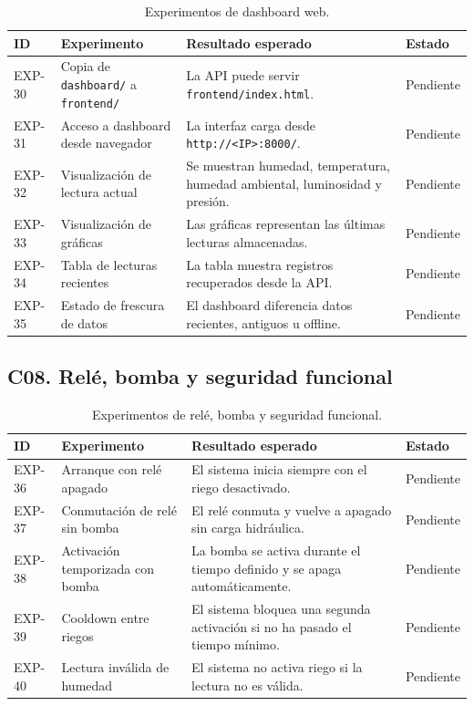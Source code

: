 \begin{table}[H]
\centering
\renewcommand{\arraystretch}{1.2}
\scriptsize
\begin{tabular}{|p{}|p{}|p{}|p{}|}
\hline
\rowcolor{gray!20}
\textbf{ID} & \textbf{Experimento} & \textbf{Resultado esperado} & \textbf{Estado} \\
\hline
EXP-30 & Copia de \texttt{dashboard/} a \texttt{frontend/} & La API puede servir \texttt{frontend/index.html}. & Pendiente \\
\hline
EXP-31 & Acceso a dashboard desde navegador & La interfaz carga desde \texttt{http://<IP>:8000/}. & Pendiente \\
\hline
EXP-32 & Visualización de lectura actual & Se muestran humedad, temperatura, humedad ambiental, luminosidad y presión. & Pendiente \\
\hline
EXP-33 & Visualización de gráficas & Las gráficas representan las últimas lecturas almacenadas. & Pendiente \\
\hline
EXP-34 & Tabla de lecturas recientes & La tabla muestra registros recuperados desde la API. & Pendiente \\
\hline
EXP-35 & Estado de frescura de datos & El dashboard diferencia datos recientes, antiguos u offline. & Pendiente \\
\hline
\end{tabular}
\caption{Experimentos de dashboard web.}
\label{tab:exp_dashboard}
\end{table}

\subsection{C08. Relé, bomba y seguridad funcional}

\begin{table}[H]
\centering
\renewcommand{\arraystretch}{1.2}
\scriptsize
\begin{tabular}{|p{}|p{}|p{}|p{}|}
\hline
\rowcolor{gray!20}
\textbf{ID} & \textbf{Experimento} & \textbf{Resultado esperado} & \textbf{Estado} \\
\hline
EXP-36 & Arranque con relé apagado & El sistema inicia siempre con el riego desactivado. & Pendiente \\
\hline
EXP-37 & Conmutación de relé sin bomba & El relé conmuta y vuelve a apagado sin carga hidráulica. & Pendiente \\
\hline
EXP-38 & Activación temporizada con bomba & La bomba se activa durante el tiempo definido y se apaga automáticamente. & Pendiente \\
\hline
EXP-39 & Cooldown entre riegos & El sistema bloquea una segunda activación si no ha pasado el tiempo mínimo. & Pendiente \\
\hline
EXP-40 & Lectura inválida de humedad & El sistema no activa riego si la lectura no es válida. & Pendiente \\
\hline
\end{tabular}
\caption{Experimentos de relé, bomba y seguridad funcional.}
\label{tab:exp_rele_bomba}
\end{table}

